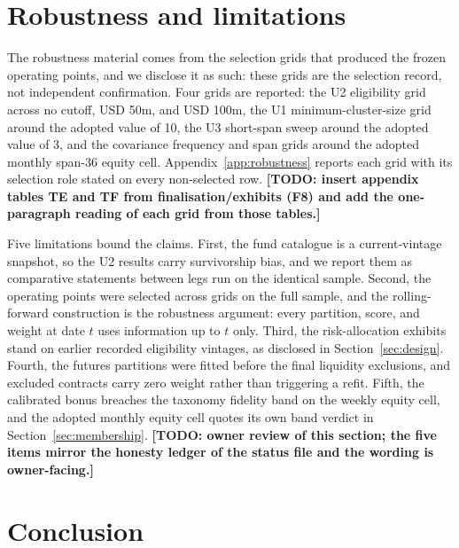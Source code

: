 \documentclass{rQUF2e}
\theoremstyle{plain}
\theoremstyle{remark}
\newcommand{\TODO}[1]{\textbf{[TODO: #1]}}
\begin{document}
\section{Robustness and limitations}
\label{sec:robustness}

The robustness material comes from the selection grids that produced the
frozen operating points, and we disclose it as such: these grids are the
selection record, not independent confirmation.
Four grids are reported: the U2 eligibility grid across no cutoff, USD 50m,
and USD 100m, the U1 minimum-cluster-size grid around the adopted value of
10, the U3 short-span sweep around the adopted value of 3, and the covariance
frequency and span grids around the adopted monthly span-36 equity cell.
Appendix~\ref{app:robustness} reports each grid with its selection role
stated on every non-selected row.
\TODO{insert appendix tables TE and TF from finalisation/exhibits (F8) and
add the one-paragraph reading of each grid from those tables.}

\label{sec:limitations}
Five limitations bound the claims. First, the fund catalogue is a
current-vintage snapshot, so the U2 results carry survivorship bias, and we
report them as comparative statements between legs run on the identical
sample. Second, the operating points were selected across grids on the full
sample, and the rolling-forward construction is the robustness argument: every
partition, score, and weight at date $t$ uses information up to $t$ only.
Third, the risk-allocation exhibits stand on earlier recorded eligibility
vintages, as disclosed in Section~\ref{sec:design}. Fourth, the futures
partitions were fitted before the final liquidity exclusions, and excluded
contracts carry zero weight rather than triggering a refit. Fifth, the
calibrated bonus breaches the taxonomy fidelity band on the weekly equity
cell, and the adopted monthly equity cell quotes its own band verdict in
Section~\ref{sec:membership}. \TODO{owner review of this section; the five
items mirror the honesty ledger of the status file and the wording is
owner-facing.}

\section{Conclusion}
\label{sec:conclusion}
\end{document}
